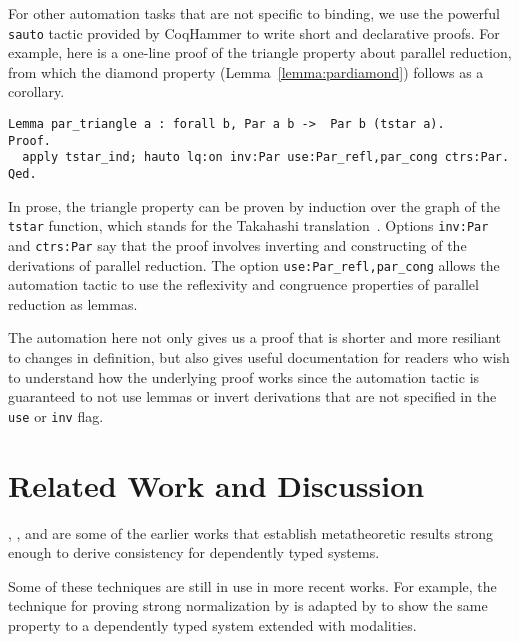 \documentclass[acmsmall,screen=true,
\ifpublic review=false\else,review=true\fi
  ,anonymous=\ifanonymous true\else false\fi]{acmart}
\newcommand{\scw}[1]{}
\begin{document}
For other automation tasks that are not specific to binding, we use
the powerful \texttt{sauto} tactic provided by CoqHammer to write
short and declarative proofs. For example, here is a one-line proof of
the triangle property about parallel reduction, from which the diamond
property (Lemma~\ref{lemma:pardiamond}) follows as a corollary.
\scw{you have space, so repeat the mathematical statement of the lemma}
\begin{verbatim}
Lemma par_triangle a : forall b, Par a b ->  Par b (tstar a).
Proof.
  apply tstar_ind; hauto lq:on inv:Par use:Par_refl,par_cong ctrs:Par.
Qed.
\end{verbatim}
In prose, the triangle property can be proven by induction over the
graph of the \texttt{tstar} function, which stands for the Takahashi
translation~\citep{takahashi-parallel-reduction}. Options \texttt{inv:Par} and
\texttt{ctrs:Par} say that the proof involves inverting and
constructing of the derivations of parallel
reduction. The option \texttt{use:Par\_refl,par\_cong} allows the
automation tactic to use
the reflexivity and congruence properties of parallel
reduction as lemmas.
\scw{What does \texttt{lq:on} and \texttt{hauto} mean?}

The automation here not only gives us a proof that is shorter and more
resiliant to changes in definition, but also gives useful
documentation for readers who wish to understand how the underlying
proof works since the automation tactic is guaranteed to not use
lemmas or invert derivations that are not specified in the
\texttt{use} or \texttt{inv} flag.


\section{Related Work and Discussion}
\label{sec:relatedwork}

\scw{Maybe it would be useful to include a chart here, so that readers can
  easily keep track of the features of the various languages.  i.e. which ones
  include large eliminations? type-directed equivalence? impredicative prop?
  inductive datatypes? what are their line counts?}

\citet{Martin-Lof-1973}, \citet{geuvers1994short}, and
\citet{barendregt:lambda-calculi-with-types} are some of the earlier
works that establish metatheoretic results strong enough to derive
consistency for dependently typed systems.
\scw{Should give Martin L\"of credit for first consistency proof.}
\scw{What techniques do these three proofs use? How is it different from
your proof? What about Luo, which
introduced a universe hierarchy? What about categories with families, or
other ways of showing consistency?}
Some of these techniques
are still in use in more recent works. For example, the technique for
proving strong normalization by \citet{geuvers1994short} is adapted by
\citet{moon2021graded} to show the same property to a dependently
typed system extended with modalities.
\end{document}
